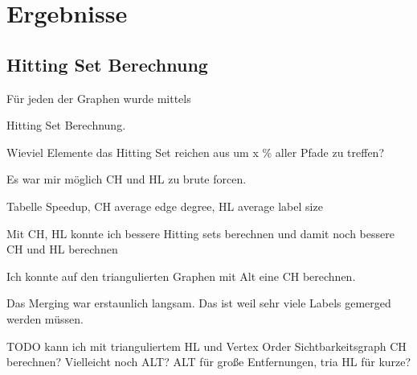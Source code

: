 \chapter{Ergebnisse}


\section{Hitting Set Berechnung}

Für jeden der Graphen wurde mittels

Hitting Set Berechnung.


Wieviel Elemente das Hitting Set reichen aus um x \% aller Pfade zu treffen?


Es war mir möglich CH und HL zu brute forcen.

Tabelle Speedup, CH average edge degree, HL average label size

Mit CH, HL konnte ich bessere Hitting sets berechnen und damit noch bessere CH und HL  berechnen



Ich konnte auf den triangulierten Graphen mit Alt eine CH berechnen.



Das Merging war erstaunlich langsam. Das ist weil sehr viele Labels gemerged werden müssen.


TODO kann ich mit trianguliertem HL und Vertex Order Sichtbarkeitsgraph CH berechnen?
Vielleicht noch ALT? ALT für große Entfernungen, tria HL für kurze?